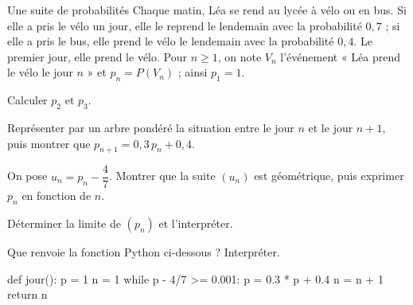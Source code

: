 \begin{exercice}[3]{Une suite de probabilités}
Chaque matin, Léa se rend au lycée à vélo ou en bus. Si elle a pris le vélo un jour, elle le reprend le lendemain avec la
probabilité $0{,}7$ ; si elle a pris le bus, elle prend le vélo le lendemain avec la probabilité $0{,}4$. Le premier jour, elle
prend le vélo. Pour $n\geq1$, on note $V_n$ l'événement « Léa prend le vélo le jour $n$ » et $p_n=P(V_n)$ ; ainsi $p_1=1$.
\begin{questions}
  \item Calculer $p_2$ et $p_3$.
  \item Représenter par un arbre pondéré la situation entre le jour $n$ et le jour $n+1$, puis montrer que $p_{n+1}=0{,}3\,p_n+0{,}4$.
  \item On pose $u_n=p_n-\dfrac47$. Montrer que la suite $(u_n)$ est géométrique, puis exprimer $p_n$ en fonction de $n$.
  \item Déterminer la limite de $(p_n)$ et l'interpréter.
  \item Que renvoie la fonction Python ci-dessous ? Interpréter.
\begin{python}
def jour():
    p = 1
    n = 1
    while p - 4/7 >= 0.001:
        p = 0.3 * p + 0.4
        n = n + 1
    return n
\end{python}
\end{questions}
\end{exercice}

